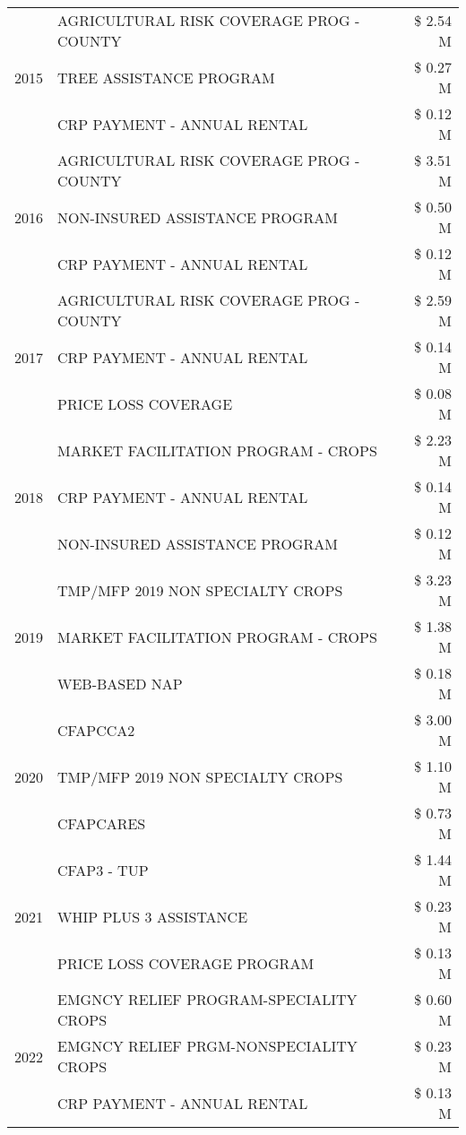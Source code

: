 \begin{tabular}{llr}
\cline{1-3}
\multirow[t]{3}{*}{2015} & AGRICULTURAL RISK COVERAGE PROG - COUNTY & \$ 2.54 M \\
 & TREE ASSISTANCE PROGRAM & \$ 0.27 M \\
 & CRP PAYMENT - ANNUAL RENTAL & \$ 0.12 M \\
\cline{1-3}
\multirow[t]{3}{*}{2016} & AGRICULTURAL RISK COVERAGE PROG - COUNTY & \$ 3.51 M \\
 & NON-INSURED ASSISTANCE PROGRAM & \$ 0.50 M \\
 & CRP PAYMENT - ANNUAL RENTAL & \$ 0.12 M \\
\cline{1-3}
\multirow[t]{3}{*}{2017} & AGRICULTURAL RISK COVERAGE PROG - COUNTY & \$ 2.59 M \\
 & CRP PAYMENT - ANNUAL RENTAL & \$ 0.14 M \\
 & PRICE LOSS COVERAGE & \$ 0.08 M \\
\cline{1-3}
\multirow[t]{3}{*}{2018} & MARKET FACILITATION PROGRAM - CROPS & \$ 2.23 M \\
 & CRP PAYMENT - ANNUAL RENTAL & \$ 0.14 M \\
 & NON-INSURED ASSISTANCE PROGRAM & \$ 0.12 M \\
\cline{1-3}
\multirow[t]{3}{*}{2019} & TMP/MFP 2019 NON SPECIALTY CROPS & \$ 3.23 M \\
 & MARKET FACILITATION PROGRAM - CROPS & \$ 1.38 M \\
 & WEB-BASED NAP & \$ 0.18 M \\
\cline{1-3}
\multirow[t]{3}{*}{2020} & CFAPCCA2 & \$ 3.00 M \\
 & TMP/MFP 2019 NON SPECIALTY CROPS & \$ 1.10 M \\
 & CFAPCARES & \$ 0.73 M \\
\cline{1-3}
\multirow[t]{3}{*}{2021} & CFAP3 - TUP & \$ 1.44 M \\
 & WHIP PLUS 3 ASSISTANCE & \$ 0.23 M \\
 & PRICE LOSS COVERAGE PROGRAM & \$ 0.13 M \\
\cline{1-3}
\multirow[t]{3}{*}{2022} & EMGNCY RELIEF PROGRAM-SPECIALITY CROPS & \$ 0.60 M \\
 & EMGNCY RELIEF PRGM-NONSPECIALITY CROPS & \$ 0.23 M \\
 & CRP PAYMENT - ANNUAL RENTAL & \$ 0.13 M \\
\cline{1-3}
\bottomrule
\end{tabular}
